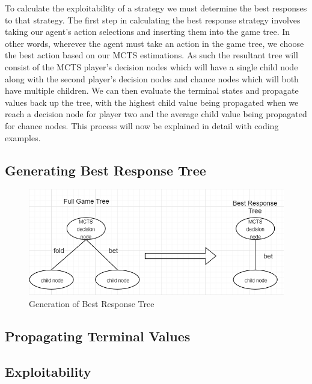 To calculate the exploitability of a strategy we must determine the best responses
to that strategy.
The first step in calculating the best response strategy involves
taking our agent's action selections and inserting them into the game tree\citep{heinrich2017reinforcement}.
In other words, wherever the agent must take an action in the game tree, we choose the best action
based on our MCTS estimations.
As such the resultant tree will consist of the MCTS player's decision nodes which will have
a single child node along with the second player's decision nodes and chance nodes
which will both have multiple children.
We can then evaluate the terminal states and propagate values back up the tree, with the highest
child value being propagated when we reach a decision node for player two and the average child
value being propagated for chance nodes.
This process will now be explained in detail with coding examples.

\subsection{Generating Best Response Tree}\label{subsec:applyMCTS}

\begin{figure}[ht]
    \includegraphics[scale=1]{images/best_response_tree_vs_full_tree.PNG}
    \caption{Generation of Best Response Tree}
\end{figure}

\subsection{Propagating Terminal Values}\label{subsec:propagateTerminals}
\subsection{Exploitability}\label{subsec:exploitability}